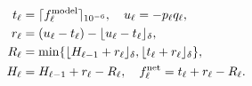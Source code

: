 \par\needspace{70pt}\begin{minipage}{\linewidth}
\begin{equation}\begin{aligned}t_\ell&=\lceil f_\ell^{\rm model}\rceil_{10^{-6}},\quad u_\ell=-p_\ell q_\ell,\\r_\ell&=(u_\ell-t_\ell)-\lfloor u_\ell-t_\ell\rfloor_\delta,\\R_\ell&=\min\{\lfloor H_{\ell-1}+r_\ell\rfloor_\delta,\lfloor t_\ell+r_\ell\rfloor_\delta\},\\H_\ell&=H_{\ell-1}+r_\ell-R_\ell,\quad f_\ell^{\rm net}=t_\ell+r_\ell-R_\ell.\end{aligned}\label{eq:8}\end{equation}
\end{minipage}\par
